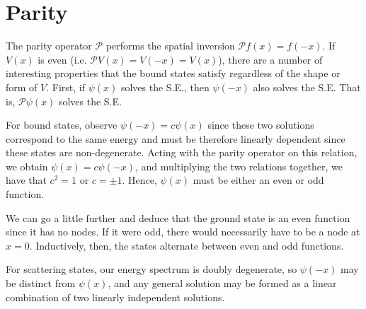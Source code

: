 \section{Parity}

The parity operator $\mathcal{P}$ performs the spatial inversion $\mathcal{P} f(x) = f(-x)$.
If $V(x)$ is even (i.e. $\mathcal{P} V(x) = V(-x) = V(x)$), there are a number of interesting properties that the bound states satisfy regardless of the shape or form of $V$.
First, if $\psi(x)$ solves the S.E., then $\psi(-x)$ also solves the S.E.
That is, $\mathcal{P} \psi(x)$ solves the S.E.

For bound states, observe $\psi(-x) = c \psi(x)$ since these two solutions correspond to the same energy and must be therefore linearly dependent since these states are non-degenerate.
Acting with the parity operator on this relation, we obtain $\psi(x) = c \psi(-x)$, and multiplying the two relations together, we have that $c^2 = 1$ or $c = \pm 1$. 
Hence, $\psi(x)$ must be either an even or odd function.

We can go a little further and deduce that the ground state is an even function since it has no nodes.
If it were odd, there would necessarily have to be a node at $x = 0$.
Inductively, then, the states alternate between even and odd functions.

For scattering states, our energy spectrum is doubly degenerate, so $\psi(-x)$ may be distinct from $\psi(x)$, and any general solution may be formed as a linear combination of two linearly independent solutions.



